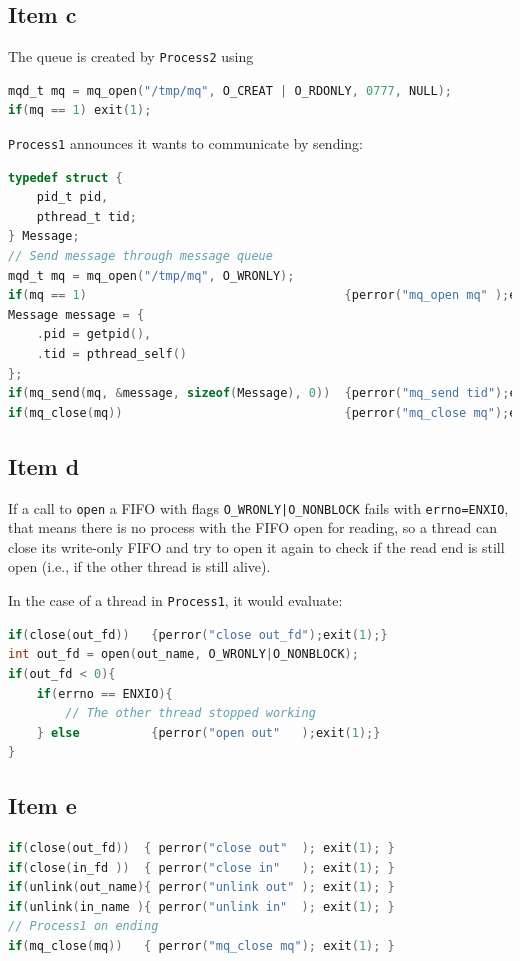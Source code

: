 {\subsection{Item c}
The queue is created by \texttt{Process2} using
\begin{lstlisting}[language=C,basicstyle=\small]
mqd_t mq = mq_open("/tmp/mq", O_CREAT | O_RDONLY, 0777, NULL);
if(mq == 1) exit(1);
\end{lstlisting}
\texttt{Process1} announces it wants to communicate by sending:
\begin{lstlisting}[language=C,basicstyle=\small]
typedef struct {
    pid_t pid,
    pthread_t tid;
} Message;
// Send message through message queue
mqd_t mq = mq_open("/tmp/mq", O_WRONLY);
if(mq == 1)                                    {perror("mq_open mq" );exit(1);}
Message message = {
    .pid = getpid(),
    .tid = pthread_self()
};
if(mq_send(mq, &message, sizeof(Message), 0))  {perror("mq_send tid");exit(1);}
if(mq_close(mq))                               {perror("mq_close mq");exit(1);}
\end{lstlisting}

\subsection{Item d}
If a call to \texttt{open} a FIFO with flags \texttt{O\_WRONLY|O\_NONBLOCK} fails with \texttt{errno=ENXIO}, that means there is no process with the FIFO open for reading, so a thread can close its write-only FIFO and try to open it again to check if the read end is still open (i.e., if the other thread is still alive).

In the case of a thread in \texttt{Process1}, it would evaluate:
\begin{lstlisting}[language=C,basicstyle=\small]
if(close(out_fd))   {perror("close out_fd");exit(1);}
int out_fd = open(out_name, O_WRONLY|O_NONBLOCK);
if(out_fd < 0){
    if(errno == ENXIO){
        // The other thread stopped working
    } else          {perror("open out"   );exit(1);}
}
\end{lstlisting}

\subsection{Item e}
\begin{lstlisting}[language=C,basicstyle=\small]
if(close(out_fd))  { perror("close out"  ); exit(1); }
if(close(in_fd ))  { perror("close in"   ); exit(1); }
if(unlink(out_name){ perror("unlink out" ); exit(1); }
if(unlink(in_name ){ perror("unlink in"  ); exit(1); }
// Process1 on ending
if(mq_close(mq))   { perror("mq_close mq"); exit(1); }
\end{lstlisting}

}
